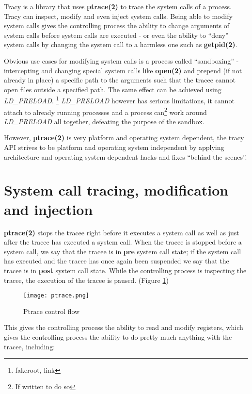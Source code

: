 \documentclass[a4paper, 10pt]{report}
\begin{document}
Tracy is a library that uses \textbf{ptrace(2)} to trace the system calls of a
process. Tracy can inspect, modify and even inject system calls. Being able to
modify system calls gives the controlling process the ability to change
arguments of system calls before system calls are executed - or even the ability
to ``deny'' system calls by changing the system call to a harmless one such as
\textbf{getpid(2)}.

Obvious use cases for modifying system calls is a process
called ``sandboxing'' - intercepting and changing special system calls like
\textbf{open(2)} and prepend (if not already in place) a specific path to the
arguments such that the tracee cannot open files outside a specified path.
The same effect can be achieved using \textit{LD\_PRELOAD}. \footnote{fakeroot,
link}%
\textit{LD\_PRELOAD} however has serious limitations, it cannot attach to
already running processes and a process can\footnote{If written to do so} work
around \textit{LD\_PRELOAD} all together, defeating the purpose of the sandbox.

However, \textbf{ptrace(2)} is very platform and operating system dependent,
the tracy API strives to be platform and operating system independent by
applying architecture and operating system dependent hacks and fixes
``behind the scenes''.

\section{System call tracing, modification and injection}

\textbf{ptrace(2)} stops the tracee right before it executes a system call as
well as just after the tracee has executed a system call. When the tracee
is stopped before a system call, we say that the tracee is in \textbf{pre}
system call state; if the system call has executed and the tracee has once again
been suspended we say that the tracee is in \textbf{post} system call state.
While the controlling process is inspecting the tracee, the execution of the
tracee is paused. (Figure \ref{fig1})


\begin{figure}
\label{fig1}
\texttt{[image: ptrace.png]}
\caption{Ptrace control flow}
\end{figure}

This gives the controlling process the ability to read and modify registers,
which gives the controlling process the ability to do pretty much anything
with the tracee, including:
\end{document}

